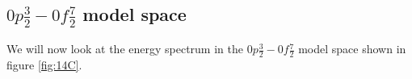 %
%

\subsection{$0p\frac32-0f\frac72$ model space}

We will now look at the energy spectrum in the $0p\frac32-0f\frac72$
model space shown in figure \ref{fig:14C}.

